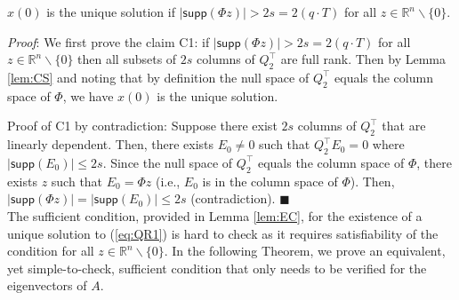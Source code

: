 \documentclass[../../thesis.tex]{subfiles}
\begin{document}
\begin{lem} \label{lem:EC}
	$x(0) $ is the unique solution if $\lvert \textsf{supp}( \Phi z) \rvert > 2 s = 2 (q\cdot T)$ for all $z \in \mathbb{R}^n \backslash \{ 0 \}$.
\end{lem}

\textit{Proof}:
We first prove the claim C1: if $\lvert \textsf{supp}( \Phi z) \rvert > 2 s = 2 (q\cdot T)$ for all $z \in \mathbb{R}^n \backslash \{ 0 \}$ then all subsets of $2s$ columns of $Q_2^\top$ are full rank. Then by Lemma \ref{lem:CS} and noting that by definition the null space of $Q_2^\top$ equals the column space of $\Phi$, we have $x(0) $ is the unique solution.

Proof of C1 by contradiction: Suppose there exist $2s$ columns of $Q_2^\top$ that are linearly dependent. Then, there exists $E_0 \neq 0$ such that $Q_2^\top E_0 = 0$ where $\lvert \textsf{supp}(E_0) \rvert \le 2s$. Since the null space of $Q_2^\top$ equals the column space of $\Phi$, there exists $z$ such that $E_0 = \Phi z$ (i.e., $E_0$ is in the column space of $\Phi$). Then, $ \lvert  \textsf{supp}(\Phi z) \rvert = \lvert \textsf {supp} (E_0) \rvert \le 2s $ (contradiction).
\hfill$\blacksquare$\\

The sufficient condition, provided in Lemma \ref{lem:EC}, for the existence of a unique solution to (\ref{eq:QR1}) is hard to check as it requires satisfiability of the condition for all $z \in \mathbb{R}^n \backslash \{ 0 \}$. In the following Theorem, we prove an equivalent, yet simple-to-check, sufficient condition that only needs to be verified for the eigenvectors of $A$.
\end{document}
